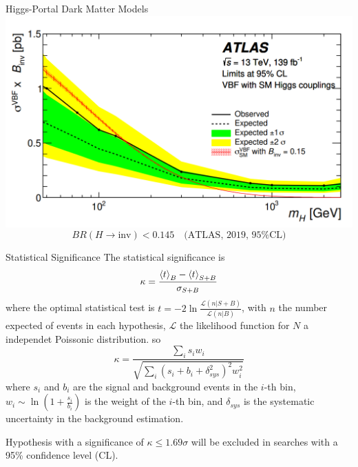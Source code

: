 \documentclass{../../bredelebeamer}
\begin{document}
\begin{frame}{Higgs-Portal Dark Matter Models}
    \includegraphics[width=\textwidth]{../Images/Altas_Result.png}
    $$
        BR(H \to \text{inv}) < 0.145 \quad \text{(ATLAS, 2019, 95\% CL)}
    $$
\end{frame}


\begin{frame}{Statistical Significance}
    The statistical significance is 
    \begin{equation}
        \kappa = \frac{\Braket{t}_{B} - \Braket{t}_{S+B}}{\sigma_{S+B}}
    \end{equation}
    where the optimal statistical test is $t=-2\ln \frac{\mathcal{L}(n|S+B)}{\mathcal{L}(n|B)}$, with $n$ the number expected of events in each hypothesis, $\mathcal{L}$ the likelihood function for $N$ a independet Poissonic distribution. so
    \begin{equation}
        \kappa = \frac{\sum_i s_i w_i}{\sqrt{\sum_i (s_i + b_i + \delta_{sys}^2)^2 w_i^2}}
    \end{equation}
    where $s_i$ and $b_i$ are the signal and background events in the $i$-th bin, $w_i\sim \ln (1+\frac{s_i}{b_i})$ is the weight of the $i$-th bin, and $\delta_{sys}$ is the systematic uncertainty in the background estimation.

    Hypothesis with a significance of $\kappa \leq 1.69\sigma$ will be excluded in searches with a 95\% confidence level (CL).
\end{frame}
\end{document}
